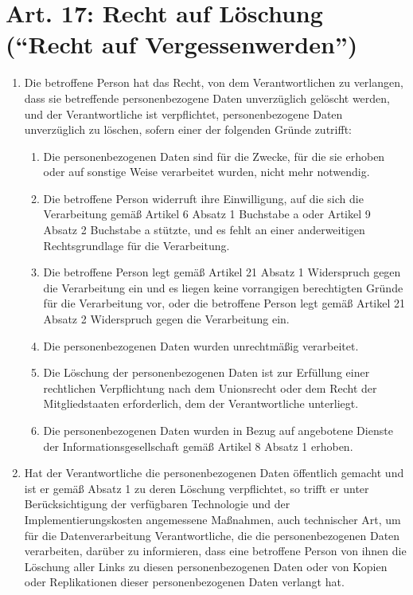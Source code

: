 \documentclass[A4, 12pt]{scrbook}
\begin{document}
    \section[Art. 17 : Recht auf Löschung]{Art. 17: Recht auf Löschung (``Recht auf Vergessenwerden'')}
        \begin{enumerate}[label=(\arabic*)]
            \item Die betroffene Person hat das Recht, von dem Verantwortlichen zu verlangen, dass sie betreffende personenbezogene Daten unverzüglich gelöscht werden, und der Verantwortliche ist verpflichtet, personenbezogene Daten unverzüglich zu löschen, sofern einer der folgenden Gründe zutrifft:
                \begin{enumerate}[label=\alph*)]
                    \item Die personenbezogenen Daten sind für die Zwecke, für die sie erhoben oder auf sonstige Weise verarbeitet wurden, nicht mehr notwendig.
                    \item Die betroffene Person widerruft ihre Einwilligung, auf die sich die Verarbeitung gemäß Artikel 6 Absatz 1 Buchstabe a oder Artikel 9 Absatz 2 Buchstabe a stützte, und es fehlt an einer anderweitigen Rechtsgrundlage für die Verarbeitung.
                    \item Die betroffene Person legt gemäß Artikel 21 Absatz 1 Widerspruch gegen die Verarbeitung ein und es liegen keine vorrangigen berechtigten Gründe für die Verarbeitung vor, oder die betroffene Person legt gemäß Artikel 21 Absatz 2 Widerspruch gegen die Verarbeitung ein.
                    \item Die personenbezogenen Daten wurden unrechtmäßig verarbeitet. 
                    \item Die Löschung der personenbezogenen Daten ist zur Erfüllung einer rechtlichen Verpflichtung nach dem Unionsrecht oder dem Recht der Mitgliedstaaten erforderlich, dem der Verantwortliche unterliegt. 
                    \item Die personenbezogenen Daten wurden in Bezug auf angebotene Dienste der Informationsgesellschaft gemäß Artikel 8 Absatz 1 erhoben.
                \end{enumerate}
            \item Hat der Verantwortliche die personenbezogenen Daten öffentlich gemacht und ist er gemäß Absatz 1 zu deren Löschung verpflichtet, so trifft er unter Berücksichtigung der verfügbaren Technologie und der Implementierungskosten angemessene Maßnahmen, auch technischer Art, um für die Datenverarbeitung Verantwortliche, die die personenbezogenen Daten verarbeiten, darüber zu informieren, dass eine betroffene Person von ihnen die Löschung aller Links zu diesen personenbezogenen Daten oder von Kopien oder Replikationen dieser personenbezogenen Daten verlangt hat.

\end{enumerate}
\end{document}

